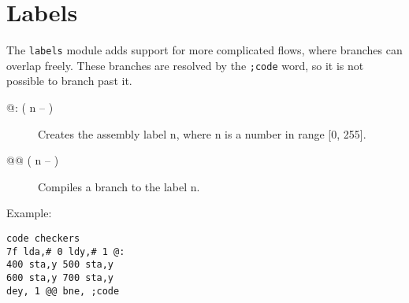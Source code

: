 \section{Labels}

The \texttt{labels} module adds support for more complicated flows, where branches can overlap freely. These branches are resolved by the \texttt{;code} word, so it is not possible to branch past it.

\begin{description}
    \item[@: ( n -- )] Creates the assembly label n, where n is a number in range [0, 255].
    \item[@@ ( n -- )] Compiles a branch to the label n.
\end{description}

Example:

\begin{verbatim}
code checkers
7f lda,# 0 ldy,# 1 @:
400 sta,y 500 sta,y
600 sta,y 700 sta,y
dey, 1 @@ bne, ;code
\end{verbatim}

